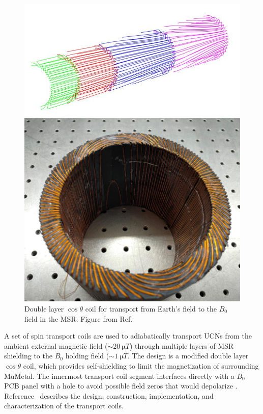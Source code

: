 \begin{figure}
\centering
\begin{minipage}{.5\textwidth}
    \centering
    \includegraphics[width=\textwidth]{figures/transport_coil_mockup.jpg}
\end{minipage}%
\begin{minipage}{.5\textwidth}
    \centering
    \includegraphics[width=\textwidth]{figures/transport_coil.jpg}
\end{minipage}
    \caption
    {Double layer $\cos\theta$ coil for transport from Earth's field to the $B_0$ field in the MSR. Figure from Ref.~}
    \label{fig:transport-coils}
\end{figure}

A set of spin transport coils are used to adiabatically transport UCNs from the ambient external magnetic field ($\sim\qty{20}{\micro T}$) through multiple layers of MSR shielding to the $B_0$ holding field ($\sim\qty{1}{\micro T}$. The design is a modified double layer $\cos\theta$ coil, which provides self-shielding to limit the magnetization of surrounding MuMetal. The innermost transport coil segment interfaces directly with a $B_0$ PCB panel with a hole to avoid possible field zeros that would depolarize \ucn. Reference~ describes the design, construction, implementation, and characterization of the transport coils.

